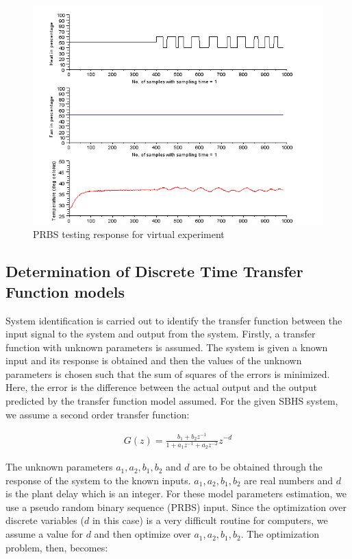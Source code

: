 \begin{figure}
\centering
\includegraphics[width=0.7\linewidth]{prbs/prbs-virtual.png}
\caption{PRBS testing response for virtual experiment}
\label{prbs-res}
\end{figure}


\subsection{Determination of Discrete Time Transfer Function models}\label{prbs-model}

System identification is carried out to identify the transfer function between the input signal to the system and output 
from the system. Firstly, a transfer function with unknown parameters is assumed. The system is given a known input and its
response is obtained and then the values of the unknown parameters is chosen such that the sum of squares of the errors is 
minimized. Here, the error is the difference between the actual output and the output predicted by the transfer function model
assumed.
For the given SBHS system, we assume a second order transfer function:

\begin{align}\label{DTF}
G(z)=\frac{b_{1}+b_{2}z^{-1}}{1+a_{1}z^{-1}+a_{2}z^{-2}}z^{-d}
\end{align}


The unknown parameters $a_1, a_2, b_1, b_2$ and $d$ are to be obtained through the response of the system to the known inputs.
$a_1, a_2, b_1, b_2$ are real numbers and $d$ is the plant delay which is an integer.  For these model parameters estimation, we
use a pseudo random binary sequence (PRBS) input. Since the optimization over discrete variables ($d$ in this case) is a very 
difficult routine for computers, we assume a value for $d$ and then optimize over  $a_1, a_2, b_1, b_2$. The optimization 
problem, then, becomes:


